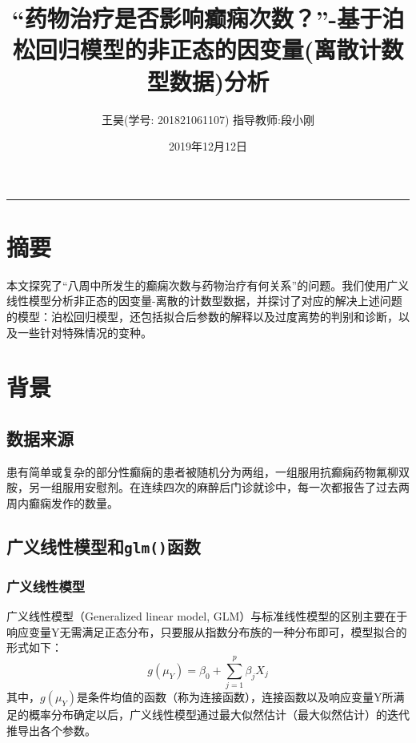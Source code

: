 \documentclass[
]{article}
\title{``药物治疗是否影响癫痫次数？''-基于泊松回归模型的非正态的因变量(离散计数型数据)分析}
\author{王昊(学号: 201821061107) 指导教师:段小刚}
\date{2019年12月12日}
\begin{document}
\maketitle

{
\setcounter{tocdepth}{4}
\tableofcontents
}
\begin{center}\rule{0.5\linewidth}{\linethickness}\end{center}

\hypertarget{ux6458ux8981}{%
\section{摘要}\label{ux6458ux8981}}

本文探究了``八周中所发生的癫痫次数与药物治疗有何关系''的问题。我们使用广义线性模型分析非正态的因变量-离散的计数型数据，并探讨了对应的解决上述问题的模型：泊松回归模型，还包括拟合后参数的解释以及过度离势的判别和诊断，以及一些针对特殊情况的变种。

\hypertarget{ux80ccux666f}{%
\section{背景}\label{ux80ccux666f}}

\hypertarget{ux6570ux636eux6765ux6e90}{%
\subsection{数据来源}\label{ux6570ux636eux6765ux6e90}}

患有简单或复杂的部分性癫痫的患者被随机分为两组，一组服用抗癫痫药物氟柳双胺，另一组服用安慰剂。在连续四次的麻醉后门诊就诊中，每一次都报告了过去两周内癫痫发作的数量。

\hypertarget{ux5e7fux4e49ux7ebfux6027ux6a21ux578bux548cglmux51fdux6570}{%
\subsection{\texorpdfstring{广义线性模型和\texttt{glm()}函数}{广义线性模型和glm()函数}}\label{ux5e7fux4e49ux7ebfux6027ux6a21ux578bux548cglmux51fdux6570}}

\hypertarget{ux5e7fux4e49ux7ebfux6027ux6a21ux578b}{%
\subsubsection{广义线性模型}\label{ux5e7fux4e49ux7ebfux6027ux6a21ux578b}}

广义线性模型（Generalized linear model,
GLM）与标准线性模型的区别主要在于响应变量Y无需满足正态分布，只要服从指数分布族的一种分布即可，模型拟合的形式如下：
\[g\left(\mu_{Y}\right)=\beta_{0}+\sum_{j=1}^{p} \beta_{j} X_{j} \]
其中，\(g\left(\mu_{Y}\right)\)是条件均值的函数（称为连接函数），连接函数以及响应变量Y所满足的概率分布确定以后，广义线性模型通过最大似然估计（最大似然估计）的迭代推导出各个参数。
\end{document}
